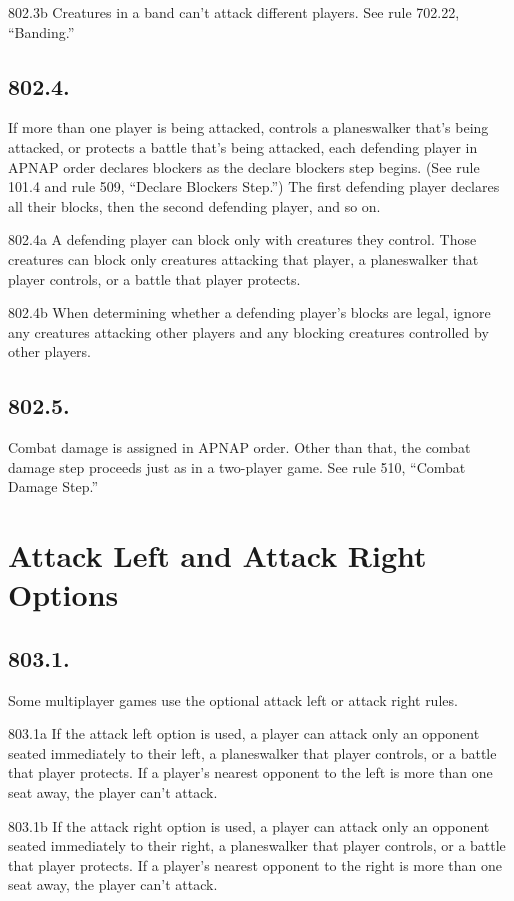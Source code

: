 802.3b Creatures in a band can’t attack different players. See rule 702.22, “Banding.”

\subsection*{802.4.}
If more than one player is being attacked, controls a planeswalker that’s being attacked, or protects a battle that’s being attacked, each defending player in APNAP order declares blockers as the declare blockers step begins. (See rule 101.4 and rule 509, “Declare Blockers Step.”) The first defending player declares all their blocks, then the second defending player, and so on.

802.4a A defending player can block only with creatures they control. Those creatures can block only creatures attacking that player, a planeswalker that player controls, or a battle that player protects.

802.4b When determining whether a defending player’s blocks are legal, ignore any creatures attacking other players and any blocking creatures controlled by other players.

\subsection*{802.5.}
Combat damage is assigned in APNAP order. Other than that, the combat damage step proceeds just as in a two-player game. See rule 510, “Combat Damage Step.”

\section{Attack Left and Attack Right Options}
\subsection*{803.1.}
Some multiplayer games use the optional attack left or attack right rules.

803.1a If the attack left option is used, a player can attack only an opponent seated immediately to their left, a planeswalker that player controls, or a battle that player protects. If a player’s nearest opponent to the left is more than one seat away, the player can’t attack.

803.1b If the attack right option is used, a player can attack only an opponent seated immediately to their right, a planeswalker that player controls, or a battle that player protects. If a player’s nearest opponent to the right is more than one seat away, the player can’t attack.

